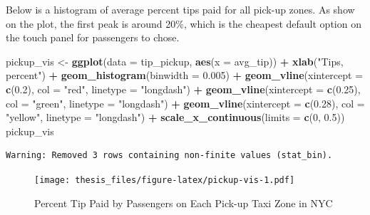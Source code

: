 \documentclass[12pt,twoside]{reedthesis}
\newenvironment{Shaded}{\begin{snugshade}}{\end{snugshade}}
\newcommand{\KeywordTok}[1]{\textcolor[rgb]{0.13,0.29,0.53}{\textbf{#1}}}
\newcommand{\DataTypeTok}[1]{\textcolor[rgb]{0.13,0.29,0.53}{#1}}
\newcommand{\DecValTok}[1]{\textcolor[rgb]{0.00,0.00,0.81}{#1}}
\newcommand{\FloatTok}[1]{\textcolor[rgb]{0.00,0.00,0.81}{#1}}
\newcommand{\StringTok}[1]{\textcolor[rgb]{0.31,0.60,0.02}{#1}}
\newcommand{\OperatorTok}[1]{\textcolor[rgb]{0.81,0.36,0.00}{\textbf{#1}}}
\newcommand{\NormalTok}[1]{#1}
\theoremstyle{definition}
\theoremstyle{definition}
\theoremstyle{definition}
\theoremstyle{remark}
\begin{document}
Below is a histogram of average percent tips paid for all pick-up zones.
As show on the plot, the first peak is around 20\%, which is the
cheapest default option on the touch panel for passengers to chose.
\begin{Shaded}
\begin{Highlighting}[]
\NormalTok{pickup_vis <-}\StringTok{ }\KeywordTok{ggplot}\NormalTok{(}\DataTypeTok{data =}\NormalTok{ tip_pickup, }\KeywordTok{aes}\NormalTok{(}\DataTypeTok{x =}\NormalTok{ avg_tip)) }\OperatorTok{+}\StringTok{ }
\StringTok{    }\KeywordTok{xlab}\NormalTok{(}\StringTok{"Tips, percent"}\NormalTok{) }\OperatorTok{+}\StringTok{ }\KeywordTok{geom_histogram}\NormalTok{(}\DataTypeTok{binwidth =} \FloatTok{0.005}\NormalTok{) }\OperatorTok{+}\StringTok{ }
\StringTok{    }\KeywordTok{geom_vline}\NormalTok{(}\DataTypeTok{xintercept =} \KeywordTok{c}\NormalTok{(}\FloatTok{0.2}\NormalTok{), }\DataTypeTok{col =} \StringTok{"red"}\NormalTok{, }\DataTypeTok{linetype =} \StringTok{"longdash"}\NormalTok{) }\OperatorTok{+}\StringTok{ }
\StringTok{    }\KeywordTok{geom_vline}\NormalTok{(}\DataTypeTok{xintercept =} \KeywordTok{c}\NormalTok{(}\FloatTok{0.25}\NormalTok{), }\DataTypeTok{col =} \StringTok{"green"}\NormalTok{, }
        \DataTypeTok{linetype =} \StringTok{"longdash"}\NormalTok{) }\OperatorTok{+}\StringTok{ }\KeywordTok{geom_vline}\NormalTok{(}\DataTypeTok{xintercept =} \KeywordTok{c}\NormalTok{(}\FloatTok{0.28}\NormalTok{), }
    \DataTypeTok{col =} \StringTok{"yellow"}\NormalTok{, }\DataTypeTok{linetype =} \StringTok{"longdash"}\NormalTok{) }\OperatorTok{+}\StringTok{ }\KeywordTok{scale_x_continuous}\NormalTok{(}\DataTypeTok{limits =} \KeywordTok{c}\NormalTok{(}\DecValTok{0}\NormalTok{, }
    \FloatTok{0.5}\NormalTok{))}
\NormalTok{pickup_vis}
\end{Highlighting}
\end{Shaded}
\begin{verbatim}
Warning: Removed 3 rows containing non-finite values (stat_bin).
\end{verbatim}
\begin{figure}
\centering
\texttt{[image: thesis\_files/figure-latex/pickup-vis-1.pdf]}
\caption{\label{fig:pickup-vis}Percent Tip Paid by Passengers on Each
Pick-up Taxi Zone in NYC}
\end{figure}
\end{document}
